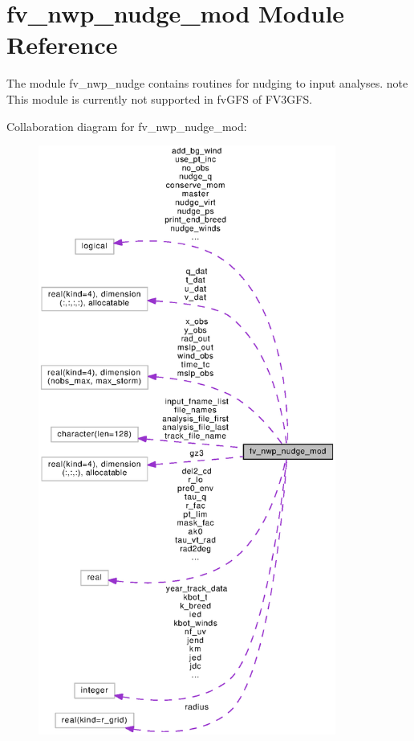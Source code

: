 \section{fv\-\_\-nwp\-\_\-nudge\-\_\-mod Module Reference}
\label{classfv__nwp__nudge__mod}


The module fv\-\_\-nwp\-\_\-nudge contains routines for nudging to input analyses. note This module is currently not supported in fv\-G\-F\-S of F\-V3\-G\-F\-S.  




Collaboration diagram for fv\-\_\-nwp\-\_\-nudge\-\_\-mod\-:
\nopagebreak
\begin{figure}[H]
\begin{center}
\leavevmode
\includegraphics[height=550pt]{classfv__nwp__nudge__mod__coll__graph}
\end{center}
\end{figure}

